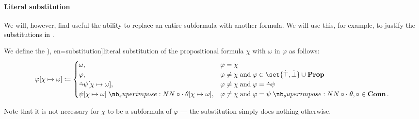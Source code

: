 \paragraph{Literal substitution}\hfill

We will, however, find useful the ability to replace an entire subformula with another formula. We will use this, for example, to justify the substitutions in .

\begin{definition}\label{def:literal_propositional_substitution}
  We define the \term[ru=подстановка (\cite[66]{КолмогоровДрагалин2006}), en=substitution]{literal substitution} of the propositional formula \( \chi \) with \( \omega \) in \( \varphi \) as follows:
  \begin{equation}\label{eq:def:propositional_substitution/single}
    \varphi[\chi \mapsto \omega] \coloneqq \begin{cases}
      \omega,                                                         &\varphi = \chi \\
      \varphi,                                                        &\varphi \neq \chi \T{and} \varphi \in \set{ \syntop, \synbot } \cup \op*{Prop} \\
      \synneg \psi[\chi \mapsto \omega],                              &\varphi \neq \chi \T{and} \varphi = \synneg \psi \\
      \psi[\chi \mapsto \omega] \syncirc \theta[\chi \mapsto \omega], &\varphi \neq \chi \T{and} \varphi = \psi \syncirc \theta, \circ \in \op*{Conn}.
    \end{cases}
  \end{equation}

  Note that it is not necessary for \( \chi \) to be a subformula of \( \varphi \) --- the substitution simply does nothing otherwise.
\end{definition}


